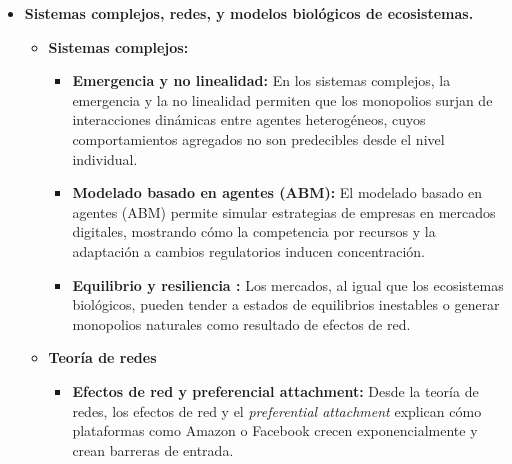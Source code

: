 \documentclass[a4paper,12pt]{article}
\begin{document}
\begin{itemize}
\begin{itemize}
\begin{itemize}
    \item \textbf{Monopolio estatal:} El Estado controla directamente la producción y venta de ciertos bienes, como la sal en China o el tabaco en Francia.

    \item \textbf{Monopolio estratégico:} Se logra mediante tácticas empresariales como fusiones, adquisiciones o contratos exclusivos. Ejemplos representativos son Standard Oil y AT\&T.

    \item \textbf{Monopolio colonial o comercial:} Implica la concesión de derechos exclusivos de comercio, usualmente por potencias coloniales, como ocurrió con las Compañías Británica y Holandesa de las Indias Orientales.
\end{itemize}
        \item \textbf{Sistemas complejos, redes, y modelos biológicos de ecosistemas.}
        \begin{itemize}
        	\item \textbf{Sistemas complejos:}
			\begin{itemize}
		    \item \textbf{Emergencia y no linealidad:} En los sistemas complejos, la emergencia y la no linealidad permiten que los monopolios surjan de interacciones dinámicas entre agentes heterogéneos, cuyos comportamientos agregados no son predecibles desde el nivel individual.

    \item \textbf{Modelado basado en agentes (ABM):} El modelado basado en agentes (ABM) permite simular estrategias de empresas en mercados digitales, mostrando cómo la competencia por recursos y la adaptación a cambios regulatorios inducen concentración.

    \item \textbf{Equilibrio y resiliencia :} Los mercados, al igual que los ecosistemas biológicos, pueden tender a estados de equilibrios inestables o generar monopolios naturales como resultado de efectos de red.
			\end{itemize}
	\item \textbf{Teoría de redes}
		\begin{itemize}
    \item \textbf{Efectos de red y preferencial attachment:} Desde la teoría de redes, los efectos de red y el \textit{preferential attachment} explican cómo plataformas como Amazon o Facebook crecen exponencialmente y crean barreras de entrada.


\end{itemize}
\end{itemize}
\end{itemize}
\end{itemize}
\end{document}

